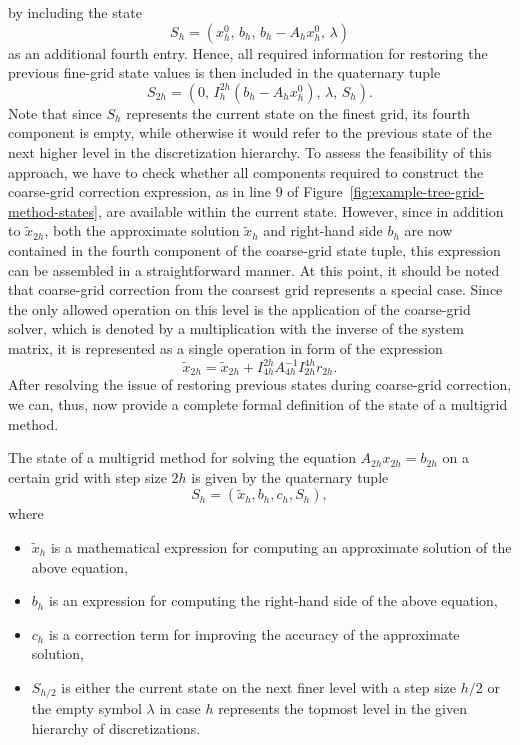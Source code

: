 by including the state 
\begin{equation*}
S_h = (x_{h}^0, \, b_h, \, b_{h} - A_h x_{h}^0, \, \lambda) 
\end{equation*} 
as an additional fourth entry. 
Hence, all required information for restoring the previous fine-grid state values is then included in the quaternary tuple 
\begin{equation*}
	S_{2h} = (0, \, I_{h}^{2h}(b_{h} - A_h x_{h}^0), \, \lambda, \, S_h).
\end{equation*}
Note that since $S_h$ represents the current state on the finest grid, its fourth component is empty, while otherwise it would refer to the previous state of the next higher level in the discretization hierarchy.
To assess the feasibility of this approach, we have to check whether all components required to construct the coarse-grid correction expression, as in line 9 of Figure~\ref{fig:example-tree-grid-method-states}, are available within the current state.
However, since in addition to $\tilde{x}_{2h}$, both the approximate solution $\tilde{x}_h$ and right-hand side $b_h$ are now contained in the fourth component of the coarse-grid state tuple, this expression can be assembled in a straightforward manner.
At this point, it should be noted that coarse-grid correction from the coarsest grid represents a special case. 
Since the only allowed operation on this level is the application of the coarse-grid solver, which is denoted by a multiplication with the inverse of the system matrix, it is represented as a single operation in form of the expression 
\begin{equation*}
	\tilde{x}_{2h} = \tilde{x}_{2h} + I_{4h}^{2h} A_{4h}^{-1} I_{2h}^{4h} r_{2h}.
\end{equation*}
After resolving the issue of restoring previous states during coarse-grid correction, we can, thus, now provide a complete formal definition of the state of a multigrid method.
\begin{definition}
\label{def:multigrid-state}
The state of a multigrid method for solving the equation $A_{2h} x_{2h} = b_{2h}$ on a certain grid with step size $2h$ is given by the quaternary tuple
\begin{equation*}
	S_{h} = \left( \tilde{x}_{h}, b_{h}, c_{h}, S_{h}\right), 
\end{equation*}
where
\begin{itemize}
	\item $\tilde{x}_{h}$ is a mathematical expression for computing an approximate solution of the above equation,
	\item $b_{h}$ is an expression for computing the right-hand side of the above equation,
	\item $c_{h}$ is a correction term for improving the accuracy of the approximate solution,
	\item $S_{h/2}$ is either the current state on the next finer level with a step size $h/2$ or the empty symbol $\lambda$ in case $h$ represents the topmost level in the given hierarchy of discretizations.
\end{itemize}
\end{definition}

